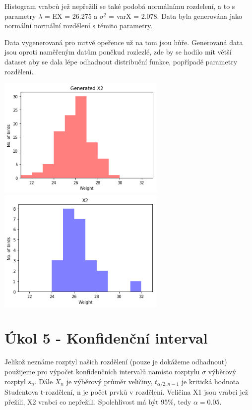 \documentclass[12pt,a4paper]{article}
\begin{document}
Histogram vrabců jež nepřežili se také podobá normálnímu rozdelení, a to s parametry $\lambda$ = EX = 26.275 a $\sigma ^2$ = varX = 2.078. Data byla generována jako normální normální rozdělení s těmito parametry.

Data vygenerovaná pro mrtvé opeřence už na tom jsou hůře. Generovaná data jsou oproti naměřeným datům poněkud rozlezlé, zde by se hodilo mít větší dataset aby se dala lépe odhadnout distribuční funkce, popřípadě parametry rozdělení.

\includegraphics[width=3.2in]{4_Died_Gen}
\includegraphics[width=3.2in]{4_Died_Data}

\par \bigskip

\section{Úkol 5 - Konfidenční interval}

Jelikož neznáme rozptyl našich rozdělení (pouze je dokážeme odhadnout) použijeme pro výpočet konfidenčních intervalů namísto rozptylu $\sigma$ výběrový rozptyl $s_n$. Dále $\bar{X}_n$ je výběrový průměr veličiny, $t_{\alpha/2,n-1}$ je kritická hodnota Studentova t-rozdělení, n je počet prvků v rozdělení. Veličina X1 jsou vrabci jež přežili, X2 vrabci co nepřežili.  Spolehlivost má být 95\%, tedy $\alpha = 0.05$.
\end{document}
